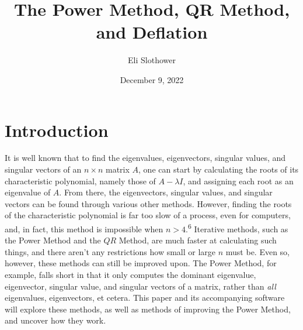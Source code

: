 \documentclass{article}
\begin{document}
\title{The Power Method, QR Method, and Deflation}
\author{Eli Slothower}
\date{December 9, 2022}
\maketitle
\setcounter{page}{1}

\section{Introduction}

It is well known that to find the eigenvalues, eigenvectors, singular values, and singular vectors of an $n \times n$ matrix $A$, one can start by calculating the roots of its characteristic polynomial, namely those of $A - \lambda I$, and assigning each root as an eigenvalue of $A$. From there, the eigenvectors, singular values, and singular vectors can be found through various other methods. However, finding the roots of the characteristic polynomial is far too slow of a process, even for computers, and, in fact, this method is impossible when $n > 4$.\textsuperscript{6} Iterative methods, such as the Power Method and the $QR$ Method, are much faster at calculating such things, and there aren't any restrictions how small or large $n$ must be. Even so, however, these methods can still be improved upon. The Power Method, for example, falls short in that it only computes the dominant eigenvalue, eigenvector, singular value, and singular vectors of a matrix, rather than \textit{all} eigenvalues, eigenvectors, et cetera. This paper and its accompanying software will explore these methods, as well as methods of improving the Power Method, and uncover how they work.
\end{document}
